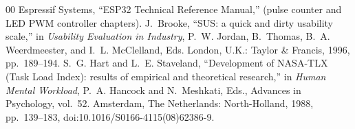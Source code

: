 \documentclass[5p,twocolumn]{elsarticle}
\begin{document}
\begin{thebibliography}{00}
 Espressif Systems, ``ESP32 Technical Reference Manual,'' (pulse counter and LED PWM controller chapters).
 J.~Brooke, ``SUS: a quick and dirty usability scale,'' in \emph{Usability Evaluation in Industry}, P.~W. Jordan, B.~Thomas, B.~A. Weerdmeester, and I.~L. McClelland, Eds. London, U.K.: Taylor \& Francis, 1996, pp.~189--194.
 S.~G. Hart and L.~E. Staveland, ``Development of NASA-TLX (Task Load Index): results of empirical and theoretical research,'' in \emph{Human Mental Workload}, P.~A. Hancock and N.~Meshkati, Eds., Advances in Psychology, vol.~52. Amsterdam, The Netherlands: North-Holland, 1988, pp.~139--183, doi:10.1016/S0166-4115(08)62386-9.
\end{thebibliography}
\end{document}
